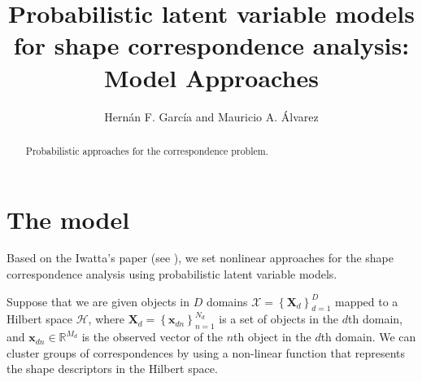 \documentclass[]{article}
\title{Probabilistic latent variable models for shape correspondence analysis: Model Approaches}
\author{Hern\'an F. Garc\'ia and Mauricio A. \'Alvarez}
\newcommand{\setObj}{\mathbf{X}_d}
\newcommand{\indobj}{\mathbf{x}_{dn}}
\newcommand{\projMat}{\boldsymbol{\mathcal{W}}_d}
\newcommand{\lvec}{\boldsymbol{\zeta}_j}
\newcommand{\mixwe}{{\theta}_j}
\newcommand{\phixnd}{\boldsymbol{\phi}\left(\indobj\right)}
\begin{document}
\maketitle

\begin{abstract}
Probabilistic approaches for the correspondence problem.
\end{abstract}

\section{The model}

Based on the Iwatta's paper (see \cite{Iwata13,Iwata16}), we set nonlinear approaches for the shape correspondence analysis using probabilistic latent variable models.

Suppose that we are given objects in $D$ domains $\mathcal{X}=\left\{\setObj\right\}_{d=1}^D$ mapped to a Hilbert space $\mathcal{H}$, where $\setObj = \left\{\indobj\right\}_{n=1}^{N_d}$ is a set of objects in the $d$th domain, and $\indobj \in \mathbb{R}^{M_d}$ is  the observed vector of the $n$th object in the $d$th domain. We can cluster groups of correspondences by using a non-linear function that represents the shape descriptors in the Hilbert space.

%
\end{document}
